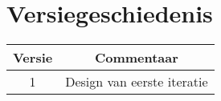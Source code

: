 \section{Versiegeschiedenis}
\begin{table}[h] %
\begin{tabular}{c|c}
 Versie & Commentaar  \\ \hline \hline
 1 & Design van eerste iteratie \\
\end{tabular}
\end{table}